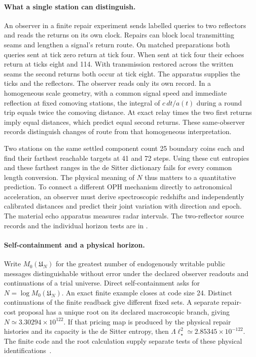 \documentclass[11pt]{article}
\theoremstyle{remark}
\theoremstyle{plain}
\begin{document}
\paragraph{What a single station can distinguish.}
An observer in a finite repair experiment sends labelled queries to
two reflectors and reads the returns on its own clock. Repairs can
block local transmitting seams and lengthen a signal's return route.
On matched preparations both queries sent at tick zero return at
tick four. When sent at tick four their echoes return at ticks eight
and 114. With transmission restored across the written seams the
second returns both occur at tick eight. The apparatus supplies the
ticks and the reflectors. The observer reads only its own record.
In a homogeneous scale geometry, with a common signal speed and
immediate reflection at fixed comoving stations, the integral of
$c\,dt/a(t)$ during a round trip equals twice the comoving distance.
At exact relay times the two first returns imply equal distances,
which predict equal second returns. These same-observer records
distinguish changes of route from that homogeneous interpretation.

Two stations on the same settled component count 25 boundary coins
each and find their farthest reachable targets at 41 and 72 steps.
Using these cut entropies and these farthest ranges in the de Sitter
dictionary fails for every common length conversion. The physical
meaning of $N$ thus matters to a quantitative prediction. To connect a
different OPH mechanism directly to astronomical acceleration, an
observer must derive spectroscopic redshifts and independently
calibrated distances and predict their joint variation with direction
and epoch. The material echo apparatus measures radar intervals.
The two-reflector source records and the individual horizon tests are
in .

\paragraph{Self-containment and a physical horizon.}
Write $M_0(\mathfrak U_N)$ for the greatest number of endogenously
writable public messages distinguishable without error under the
declared observer readouts and continuations of a trial universe.
Direct self-containment asks for $N=\log M_0(\mathfrak U_N)$.
An exact finite example closes at code size 24. Distinct continuations
of the finite readback give different fixed sets. A separate
repair-cost proposal has a unique root on its declared macroscopic
branch, giving $N\simeq3.30294\times10^{122}$. If that pricing map is
produced by the physical repair histories and its capacity is the de
Sitter entropy, then $\Lambda\ell_\star^2\simeq2.85345\times10^{-122}$.
The finite code and the root calculation supply separate tests of these
physical identifications~\cite{ophobservers}.
\end{document}
